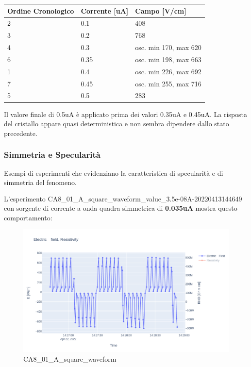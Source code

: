\documentclass[11pt]{article}
\begin{document}
\begin{longtable}[]{@{}lll@{}}
\toprule
Ordine Cronologico & Corrente {[}uA{]} & Campo {[}V/cm{]}\tabularnewline
\midrule
\endhead
2 & 0.1 & 408\tabularnewline
3 & 0.2 & 768\tabularnewline
4 & 0.3 & osc. min 170, max 620\tabularnewline
6 & 0.35 & osc. min 198, max 663\tabularnewline
1 & 0.4 & osc. min 226, max 692\tabularnewline
7 & 0.45 & osc. min 255, max 716\tabularnewline
5 & 0.5 & 283\tabularnewline
\bottomrule
\end{longtable}

Il valore finale di 0.5uA è applicato prima dei valori 0.35uA e 0.45uA.
La risposta del cristallo appare quasi deterministica e non sembra
dipendere dallo stato precedente.

    \hypertarget{simmetria-e-specularituxe0}{%
\subsubsection{Simmetria e
Specularità}\label{simmetria-e-specularituxe0}}

Esempi di esperimenti che evidenziano la caratteristica di specularità e
di simmetria del fenomeno.

L'esperimento
CA8\_01\_A\_square\_waveform\_value\_3.5e-08A-20220413144649 con
sorgente di corrente a onda quadra simmetrica di \textbf{0.035uA} mostra
questo comportamento:

\begin{figure}
\centering
\includegraphics{CA8_01_A_square-e.png}
\caption{CA8\_01\_A\_square\_waveform}
\end{figure}
\end{document}
